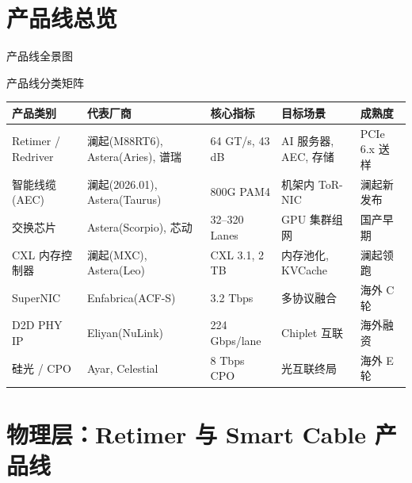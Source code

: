 \documentclass[aspectratio=169, 10pt, UTF8]{ctexbeamer}
\begin{document}
\section{产品线总览}

\begin{frame}{产品线全景图}
  \centering
\end{frame}

\begin{frame}{产品线分类矩阵}
  \centering
  \footnotesize
  \begin{tabularx}{\textwidth}{p{2.4cm} p{2.8cm} p{3.2cm} p{3.2cm} p{3.0cm}}
    \toprule
    \textbf{产品类别} & \textbf{代表厂商} & \textbf{核心指标} & \textbf{目标场景} & \textbf{成熟度} \\
    \midrule
    Retimer / Redriver
      & 澜起(M88RT6), Astera(Aries), 谱瑞
      & 64 GT/s, 43 dB
      & AI 服务器, AEC, 存储
      & PCIe 6.x 送样 \\
    \addlinespace
    智能线缆 (AEC)
      & 澜起(2026.01), Astera(Taurus)
      & 800G PAM4
      & 机架内 ToR-NIC
      & 澜起新发布 \\
    \addlinespace
    交换芯片
      & Astera(Scorpio), 芯动
      & 32--320 Lanes
      & GPU 集群组网
      & 国产早期 \\
    \addlinespace
    CXL 内存控制器
      & 澜起(MXC), Astera(Leo)
      & CXL 3.1, 2 TB
      & 内存池化, KVCache
      & 澜起领跑 \\
    \addlinespace
    SuperNIC
      & Enfabrica(ACF-S)
      & 3.2 Tbps
      & 多协议融合
      & 海外 C 轮 \\
    \addlinespace
    D2D PHY IP
      & Eliyan(NuLink)
      & 224 Gbps/lane
      & Chiplet 互联
      & 海外融资 \\
    \addlinespace
    硅光 / CPO
      & Ayar, Celestial
      & 8 Tbps CPO
      & 光互联终局
      & 海外 E 轮 \\
    \bottomrule
  \end{tabularx}
\end{frame}

\section{物理层：Retimer 与 Smart Cable 产品线}
\end{document}

